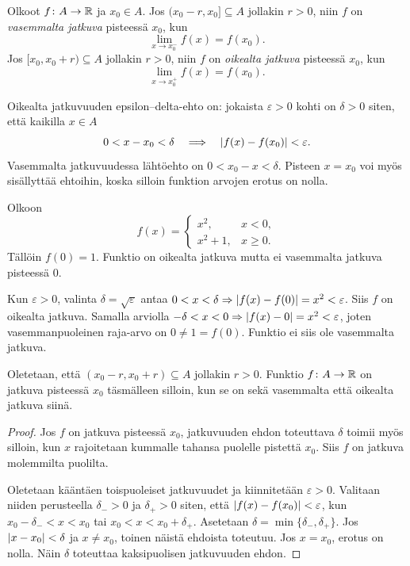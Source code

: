 \documentclass[11pt,a4paper]{amsart}
\begin{document}
\begin{definition}
  Olkoot $f\colon A\to\mathbb{R}$ ja $x_0\in A$.
  Jos $(x_0-r,x_0]\subseteq A$ jollakin $r>0$, niin $f$ on
  \emph{vasemmalta jatkuva} pisteessä $x_0$, kun
  \[
    \lim_{x\to x_0^-}f(x)=f(x_0).
  \]
  Jos $[x_0,x_0+r)\subseteq A$ jollakin $r>0$, niin $f$ on
  \emph{oikealta jatkuva} pisteessä $x_0$, kun
  \[
    \lim_{x\to x_0^+}f(x)=f(x_0).
  \]
\end{definition}

Oikealta jatkuvuuden epsilon--delta-ehto on: jokaista
$\varepsilon>0$ kohti on $\delta>0$ siten, että kaikilla $x\in A$
\[
  0<x-x_0<\delta\quad\Longrightarrow\quad
  \lvert f(x)-f(x_0)\rvert<\varepsilon.
\]
Vasemmalta jatkuvuudessa lähtöehto on $0<x_0-x<\delta$.
Pisteen $x=x_0$ voi myös sisällyttää ehtoihin, koska silloin
funktion arvojen erotus on nolla.

\begin{example}
  Olkoon
  \[
    f(x)=
    \begin{cases}x^2,&x<0,\\x^2+1,&x\ge0.
    \end{cases}
  \]
  Tällöin $f(0)=1$. Funktio on oikealta jatkuva mutta ei
  vasemmalta jatkuva pisteessä $0$.
\end{example}
\begin{solution}
  Kun $\varepsilon>0$, valinta $\delta=\sqrt{\varepsilon}$ antaa
  $0<x<\delta\Rightarrow\lvert f(x)-f(0)\rvert=x^2<\varepsilon$.
  Siis $f$ on oikealta jatkuva. Samalla arviolla
  $-\delta<x<0\Rightarrow\lvert f(x)-0\rvert=x^2<\varepsilon$, joten
  vasemmanpuoleinen raja-arvo on $0\ne1=f(0)$.
  Funktio ei siis ole vasemmalta jatkuva.
\end{solution}

\begin{theorem}
  Oletetaan, että $(x_0-r,x_0+r)\subseteq A$ jollakin $r>0$.
  Funktio $f\colon A\to\mathbb{R}$ on jatkuva pisteessä $x_0$ täsmälleen
  silloin, kun se on sekä vasemmalta että oikealta jatkuva siinä.
\end{theorem}
\begin{proof}
  Jos $f$ on jatkuva pisteessä $x_0$, jatkuvuuden ehdon toteuttava
  $\delta$ toimii myös silloin, kun $x$ rajoitetaan kummalle tahansa
  puolelle pistettä $x_0$. Siis $f$ on jatkuva molemmilta puolilta.

  Oletetaan kääntäen toispuoleiset jatkuvuudet ja kiinnitetään
  $\varepsilon>0$. Valitaan niiden perusteella $\delta_->0$ ja
  $\delta_+>0$ siten, että $\lvert f(x)-f(x_0)\rvert<\varepsilon$, kun
  $x_0-\delta_-<x<x_0$ tai $x_0<x<x_0+\delta_+$.
  Asetetaan $\delta=\min\{\delta_-,\delta_+\}$.
  Jos $\lvert x-x_0\rvert<\delta$ ja $x\ne x_0$, toinen näistä ehdoista
  toteutuu. Jos $x=x_0$, erotus on nolla. Näin $\delta$ toteuttaa
  kaksipuolisen jatkuvuuden ehdon.
\end{proof}
\end{document}
